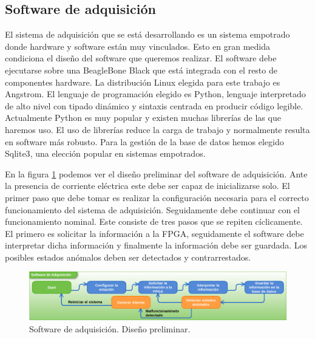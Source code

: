 	\subsection{Software de adquisición}
		El sistema de adquisición que se está desarrollando es un sistema empotrado donde hardware y software están muy vinculados. Esto en
		gran medida condiciona el diseño del software que queremos realizar. El software debe ejecutarse sobre una BeagleBone
		Black\cite{Beagle} que está integrada con el resto de componentes hardware.  La distribución Linux elegida para este trabajo es
		Angstrom. El lenguaje de programación elegido es Python\cite{Python}, lenguaje interpretado de alto nivel con tipado dinámico y
		sintaxis centrada en producir código legible.  Actualmente Python es muy popular y existen muchas librerías de las que haremos uso. El
		uso de librerías reduce la carga de trabajo y normalmente resulta en software más robusto. Para la gestión de la base de datos hemos
		elegido Sqlite3\cite{Sqlite}, una elección popular en sistemas empotrados. 
		\par
		En la figura \ref{fig:soft_control_preliminar} podemos ver el diseño preliminar del software de adquisición. Ante la presencia de
		corriente eléctrica este debe ser capaz de inicializarse solo. El primer paso que debe tomar es realizar la configuración necesaria
		para el correcto funcionamiento del sistema de adquisición. Seguidamente debe continuar con el funcionamiento nominal. Este consiste
		de tres pasos que se repiten cíclicamente. El primero es solicitar la información a la FPGA, seguidamente el software debe interpretar
		dicha información y finalmente la información debe ser guardada. Los posibles estados anómalos deben ser detectados y contrarrestados. 
		\begin{figure}[h]
			\centering
			\includegraphics[keepaspectratio, width=1\textwidth]{./img/soft_control_preliminar.png}
			\caption{Software de adquisición. Diseño preliminar.}
			\label{fig:soft_control_preliminar}
		\end{figure}
